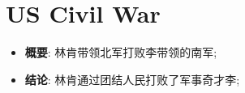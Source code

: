 \section{US Civil War}

  \begin{itemize}
    \item \textbf{概要}: 林肯带领北军打败李带领的南军;
    \item \textbf{结论}: 林肯通过团结人民打败了军事奇才李;
  \end{itemize}

